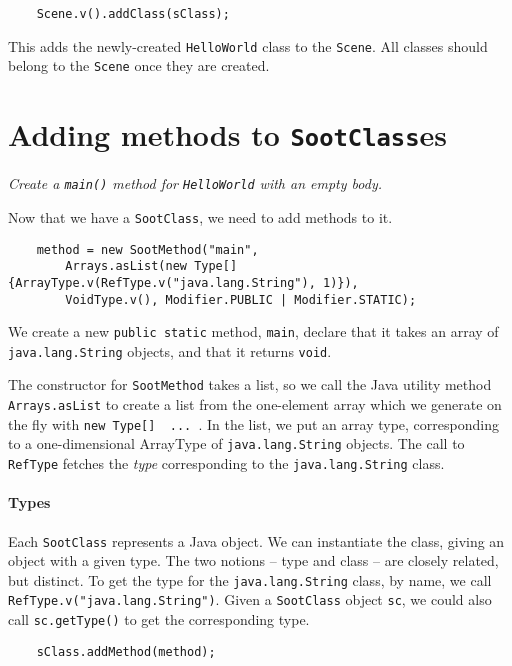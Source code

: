 \documentclass{article}
\begin{document}
\noindent
\begin{verbatim}    Scene.v().addClass(sClass); \end{verbatim}

This adds the newly-created {\tt HelloWorld} class to the {\tt Scene}.  All classes
should belong to the {\tt Scene} once they are created.

\section{Adding methods to {\tt SootClass}es}

{\em Create a {\tt main()} method for {\tt HelloWorld} with an empty body.} 

Now that we have a {\tt SootClass}, we need to add methods to it.

\noindent
\begin{verbatim}
    method = new SootMethod("main",                 
        Arrays.asList(new Type[] {ArrayType.v(RefType.v("java.lang.String"), 1)}),
        VoidType.v(), Modifier.PUBLIC | Modifier.STATIC); 
\end{verbatim}

We create a new {\tt public static} method, {\tt main}, declare that it takes
an array of {\tt java.lang.String} objects, and that it returns {\tt void}.

The constructor for {\tt SootMethod} takes a list, so we call the Java
utility method {\tt Arrays.asList} to create a list from the
one-element array which we generate on the fly with
{\tt new Type[] { ... }}.  In the list, we put an array type,
corresponding to a one-dimensional ArrayType of {\tt java.lang.String}
objects.  The call to {\tt RefType} fetches the {\em type}
corresponding to the {\tt java.lang.String} class.

\paragraph{Types} Each {\tt SootClass} represents a Java object.  We can
instantiate the class, giving an object with a given type.  The two
notions -- type and class -- are closely related, but distinct.  To
get the type for the {\tt java.lang.String} class, by name, we call
{\tt RefType.v("java.lang.String")}.  Given a {\tt SootClass} object
{\tt sc}, we could also call {\tt sc.getType()} to get the
corresponding type.

\noindent
\begin{verbatim}    sClass.addMethod(method); \end{verbatim}
\end{document}
